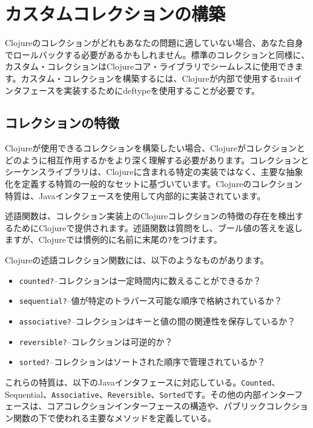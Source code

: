 \section{カスタムコレクションの構築}

Clojureのコレクションがどれもあなたの問題に適していない場合、あなた自身でロールバックする必要があるかもしれません。標準のコレクションと同様に、カスタム・コレクションはClojureコア・ライブラリでシームレスに使用できます。カスタム・コレクションを構築するには、Clojureが内部で使用するtraitインタフェースを実装するためにdeftypeを使用することが必要です。

\subsection{コレクションの特徴}

Clojureが使用できるコレクションを構築したい場合、Clojureがコレクションとどのように相互作用するかをより深く理解する必要があります。コレクションとシーケンスライブラリは、Clojureに含まれる特定の実装ではなく、主要な抽象化を定義する特質の一般的なセットに基づいています。Clojureのコレクション特質は、Javaインタフェースを使用して内部的に実装されています。

述語関数は、コレクション実装上のClojureコレクションの特徴の存在を検出するためにClojureで提供されます。述語関数は質問をし、ブール値の答えを返しますが、Clojureでは慣例的に名前に末尾の\texttt{?}をつけます。

Clojureの述語コレクション関数には、以下のようなものがあります。


\begin{itemize}
\item \texttt{counted?}--コレクションは一定時間内に数えることができるか？
\item \texttt{sequential?}--値が特定のトラバース可能な順序で格納されているか？
\item \texttt{associative?}--コレクションはキーと値の間の関連性を保存しているか？
\item \texttt{reversible?}--コレクションは可逆的か？
\item \texttt{sorted?}--コレクションはソートされた順序で管理されているか？
\end{itemize}

これらの特質は、以下のJavaインタフェースに対応している。\texttt{Counted}、Sequential、\texttt{Associative}、\texttt{Reversible}、\texttt{Sorted}です。その他の内部インターフェースは、コアコレクションインターフェースの構造や、パブリックコレクション関数の下で使われる主要なメソッドを定義している。

